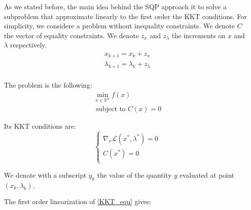 As we stated before, the main idea behind the SQP approach it to solve a subproblem that approximate linearly to the first order the KKT conditions.
For simplicity, we considere a problem without inequality constraints.
We denote $C$ the vector of equality constraints.
We denote $z_x$ and $z_\lambda$ the increments on $x$ and $\lambda$ respectively.
\begin{equation}
  \begin{array}{l}
    x_{k+1} = x_k + z_x\\
    \lambda_{k+1} = \lambda_k+z_\lambda\\
  \end{array}
\end{equation}

The problem is the following:
\begin{equation}
  \begin{array}{l}
    \min\limits_{x\in\mathbb{R}^n}{f(x)} \\
    \text{ subject to } C(x) = 0
  \end{array}
\end{equation}

Its KKT conditions are:
\begin{equation}
  \label{KKT_equ}
  \left\{
\begin{array}{ll}
  \nabla_x\mathcal{L}(x^*,\lambda^*) = 0\\
  C(x^*) = 0\\
\end{array}
\right.
\end{equation}

We denote with a subscript $y_k$ the value of the quantity $y$ evaluated at point $(x_k, \lambda_k)$.

The first order linearization of \ref{KKT_equ} gives:

